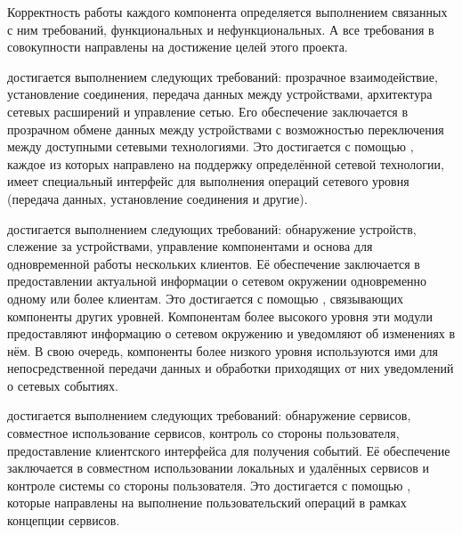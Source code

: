 

%
Корректность работы каждого компонента \PeerHood определяется выполнением связанных с ним требований, функциональных и нефункциональных.
%
А все требования в совокупности направлены на достижение целей этого проекта. 

%
 достигается выполнением следующих требований: прозрачное взаимодействие, установление соединения, передача данных между устройствами, архитектура сетевых расширений и управление сетью. 
%
Его обеспечение заключается в прозрачном обмене данных между устройствами с возможностью переключения между доступными сетевыми технологиями.
%
Это достигается с помощью , каждое из которых направлено на поддержку определённой сетевой технологии, имеет специальный интерфейс для выполнения операций сетевого уровня (передача данных, установление соединения и другие). 

%
 достигается выполнением следующих требований: обнаружение устройств, слежение за устройствами, управление компонентами и основа для одновременной работы нескольких клиентов.
%
Её обеспечение заключается в предоставлении актуальной информации о сетевом окружении одновременно одному или более клиентам. 
%
Это достигается с помощью , связывающих компоненты других уровней. 
%
Компонентам более высокого уровня эти модули предоставляют информацию о сетевом окружению и уведомляют об изменениях в нём. 
%
В свою очередь, компоненты более низкого уровня используются ими для непосредственной передачи данных и обработки приходящих от них уведомлений о сетевых событиях. 

%
 достигается выполнением следующих требований: обнаружение сервисов, совместное использование сервисов, контроль со стороны пользователя, предоставление клиентского интерфейса для получения событий.
%
Её обеспечение заключается в совместном использовании локальных и удалённых сервисов и контроле системы со стороны пользователя. 
%
Это достигается с помощью , которые направлены на выполнение пользовательский операций в рамках концепции сервисов. 

